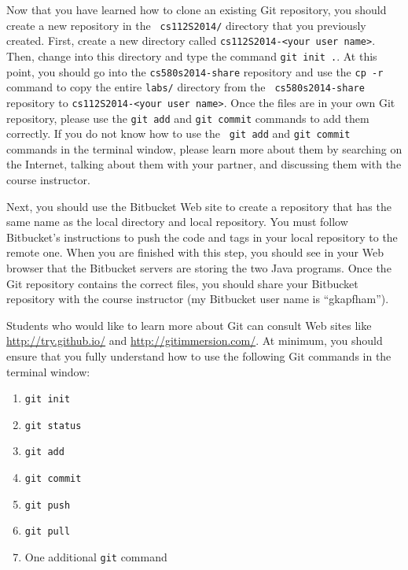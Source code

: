 Now that you have learned how to clone an existing Git repository, you should create a new repository in the {\tt
cs112S2014/} directory that you previously created.  First, create a new directory called {\tt cs112S2014-<your user
name>}. Then, change into this directory and type the command {\tt git init .}.  At this point, you should go into the
{\tt cs580s2014-share} repository and use the {\tt cp -r} command to copy the entire {\tt labs/} directory from the {\tt
cs580s2014-share} repository to {\tt cs112S2014-<your user name>}.  Once the files are in your own Git repository,
please use the {\tt git add} and {\tt git commit} commands to add them correctly. If you do not know how to use the {\tt
git add} and {\tt git commit} commands in the terminal window, please learn more about them by searching on the
Internet, talking about them with your partner, and discussing them with the course instructor.

Next, you should use the Bitbucket Web site to create a repository that has the same name as the local directory and
local repository.  You must follow Bitbucket's instructions to push the code and tags in your local repository to the
remote one. When you are finished with this step, you should see in your Web browser that the Bitbucket servers are
storing the two Java programs. Once the Git repository contains the correct files, you should share your Bitbucket
repository with the course instructor (my Bitbucket user name is ``gkapfham'').

Students who would like to learn more about Git can consult Web sites like \url{http://try.github.io/} and
\url{http://gitimmersion.com/}.  At minimum, you should ensure that you fully understand how to use the following Git
commands in the terminal window:

\begin{enumerate} 
			
	\item {\tt git init}

	\item {\tt git status}

	\item {\tt git add} 

	\item {\tt git commit}

	\item {\tt git push}

	\item {\tt git pull} 

	\item One additional {\tt git} command

\end{enumerate}

